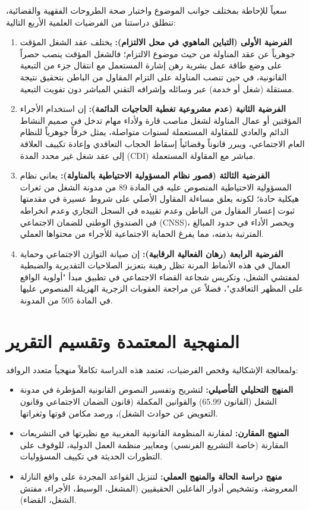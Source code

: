 سعياً للإحاطة بمختلف جوانب الموضوع واختبار صحة الطروحات الفقهية والقضائية، تنطلق دراستنا من الفرضيات العلمية الأربع التالية:
\begin{enumerate}
    \item \textbf{الفرضية الأولى (التباين الماهوي في محل الالتزام):} يختلف عقد الشغل المؤقت جوهرياً عن عقد المناولة من حيث موضوع الالتزام؛ فالشغل المؤقت ينصب حصراً على وضع طاقة عمل بشرية رهن إشارة المستعمل مع انتقال جزء من التبعية القانونية، في حين تنصب المناولة على التزام المقاول من الباطن بتحقيق نتيجة مستقلة (شغل أو خدمة) عبر وسائله وإشرافه التقني المباشر دون تفويت التبعية.
    \item \textbf{الفرضية الثانية (عدم مشروعية تغطية الحاجيات الدائمة):} إن استخدام الأجراء المؤقتين أو عمال المناولة لشغل مناصب قارة ولأداء مهام تدخل في صميم النشاط الدائم والعادي للمقاولة المستعملة لسنوات متواصلة، يمثل خرقاً جوهرياً للنظام العام الاجتماعي، ويبرر قانوناً وقضائياً إسقاط الحجاب التعاقدي وإعادة تكييف العلاقة إلى عقد شغل غير محدد المدة (CDI) مباشر مع المقاولة المستعملة.
    \item \textbf{الفرضية الثالثة (قصور نظام المسؤولية الاحتياطية بالمناولة):} يعاني نظام المسؤولية الاحتياطية المنصوص عليه في المادة 89 من مدونة الشغل من ثغرات هيكلية حادة؛ لكونه يعلق مساءلة المقاول الأصلي على شروط عسيرة في مقدمتها ثبوت إعسار المقاول من الباطن وعدم تقييده في السجل التجاري وعدم انخراطه في الصندوق الوطني للضمان الاجتماعي (CNSS)، ويحصر الأداء في حدود المبالغ المترتبة بذمته، مما يفرغ الحماية الاجتماعية للأجراء من محتواها العملي.
    \item \textbf{الفرضية الرابعة (رهان الفعالية الرقابية):} إن صيانة التوازن الاجتماعي وحماية العمال في هذه الأنماط المرنة تظل رهينة بتعزيز الصلاحيات التقديرية والضبطية لمفتشي الشغل، وتكريس شجاعة القضاء الاجتماعي في تطبيق مبدأ "أولوية الواقع على المظهر التعاقدي"، فضلاً عن مراجعة العقوبات الزجرية الهزيلة المنصوص عليها في المادة 505 من المدونة.
\end{enumerate}

\section*{المنهجية المعتمدة وتقسيم التقرير}

ولمعالجة الإشكالية وفحص الفرضيات، تعتمد هذه الدراسة تكاملاً منهجياً متعدد الروافد:
\begin{itemize}
    \item \textbf{المنهج التحليلي التأصيلي:} لتشريح وتفسير النصوص القانونية المؤطرة في مدونة الشغل (القانون 65.99) والقوانين المكملة (قانون الضمان الاجتماعي وقانون التعويض عن حوادث الشغل)، ورصد مكامن قوتها وثغراتها.
    \item \textbf{المنهج المقارن:} لمقارنة المنظومة القانونية المغربية مع نظيرتها في التشريعات المقارنة (خاصة التشريع الفرنسي) ومعايير منظمة العمل الدولية، للوقوف على التطورات الحديثة في تكييف المسؤوليات.
    \item \textbf{منهج دراسة الحالة والمنهج العملي:} لتنزيل القواعد المجردة على واقع النازلة المعروضة، وتشخيص أدوار الفاعلين الحقيقيين (المشغل، الوسيط، الأجراء، مفتش الشغل، القضاء).
\end{itemize}


